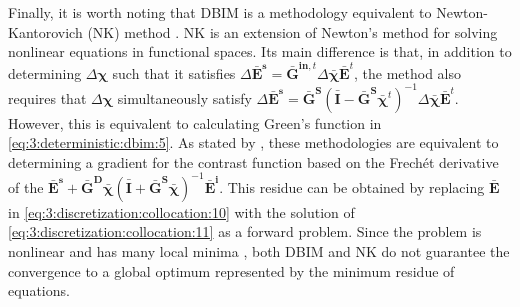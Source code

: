 			Finally, it is worth noting that DBIM is a methodology equivalent to Newton-Kantorovich (NK) method \citep{remis2000equivalence}. NK is an extension of Newton's method for solving nonlinear equations in functional spaces. Its main difference is that, in addition to determining $\Delta\boldsymbol{\chi}$ such that it satisfies $\Delta\mathbf{\bar{E}^s} = \mathbf{\bar{G}}^{\mathbf{in},t}\Delta\boldsymbol{\bar{\chi}}\mathbf{\bar{E}}^t$, the method also requires that $\Delta\boldsymbol{\chi}$ simultaneously satisfy $\Delta\mathbf{\bar{E}^s} = \mathbf{\bar{G}^S}(\mathbf{\bar{I}} - \mathbf{\bar{G}^S}\boldsymbol{\bar{\chi}}^t)^{-1} \Delta\boldsymbol{\bar{\chi}}\mathbf{\bar{E}}^t$. However, this is equivalent to calculating Green's function in \eqref{eq:3:deterministic:dbim:5}. As stated by \cite{chen2017}, these methodologies are equivalent to determining a gradient for the contrast function based on the Frechét derivative of the $\mathbf{\bar{E}^s}+\mathbf{\bar{G}^D}\boldsymbol{\bar{\chi}}(\mathbf{\bar{I}}+\mathbf{\bar{G}^S}\boldsymbol{\bar{\chi}})^{-1}\mathbf{\bar{E}^i}$. This residue can be obtained by replacing $\mathbf{\bar{E}}$ in \eqref{eq:3:discretization:collocation:10} with the solution of \eqref{eq:3:discretization:collocation:11} as a forward problem. Since the problem is nonlinear and has many local minima \citep{chen2017}, both DBIM and NK do not guarantee the convergence to a global optimum represented by the minimum residue of equations.

